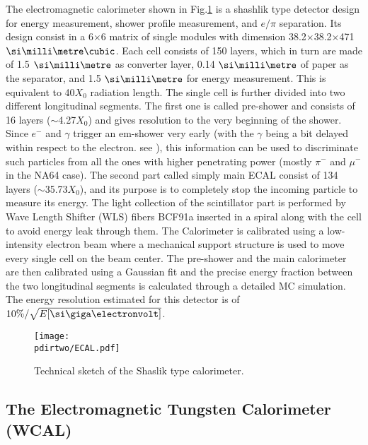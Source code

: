 The electromagnetic calorimeter shown in Fig.\ref{fig:ecal-sketch} is a shashlik type detector design for energy measurement, shower profile measurement, and $e/\pi$ separation. Its design consist in a 6$\times$6 matrix of single modules with dimension 38.2$\times$38.2$\times$471 $\mmc$. Each cell consists of 150 layers, which in turn are made of 1.5 $\mmi$ as converter layer, 0.14 $\mmi$ of paper as the separator, and 1.5 $\mmi$ for energy measurement. This is equivalent to 40$X_0$ radiation length. The single cell is further divided into two different longitudinal segments. The first one is called pre-shower and consists of 16 layers ($\sim$4.27$X_0$) and gives resolution to the very beginning of the shower. Since $e^-$ and $\gamma$ trigger an em-shower very early (with the $\gamma$ being a bit delayed within respect to the electron. see \cite{Bichsel:2002cf}), this information can be used to discriminate such particles from all the ones with higher penetrating power (mostly $\pi^-$ and $\mu^-$ in the NA64 case). The second part called simply main ECAL consist of 134 layers ($\sim$35.73$X_0$), and its purpose is to completely stop the incoming particle to measure its energy. The light collection of the scintillator part is performed by Wave Length Shifter (WLS) fibers BCF91a \cite{wls-fibers} inserted in a spiral along with the cell to avoid energy leak through them. The Calorimeter is calibrated using a low-intensity electron beam where a mechanical support structure is used to move every single cell on the beam center. The pre-shower and the main calorimeter are then calibrated using a Gaussian fit and the precise energy fraction between the two longitudinal segments is calculated through a detailed MC simulation. The energy resolution estimated for this detector is of $10\% / \sqrt{E[\gev]}$.

\begin{figure}[bth!]
\centering
\texttt{[image: \\pdirtwo/ECAL.pdf]}
\caption[ECAL sketch]{Technical sketch of the Shaslik type calorimeter.}
\label{fig:ecal-sketch}
\end{figure}

\subsection{The Electromagnetic Tungsten Calorimeter (WCAL)}

